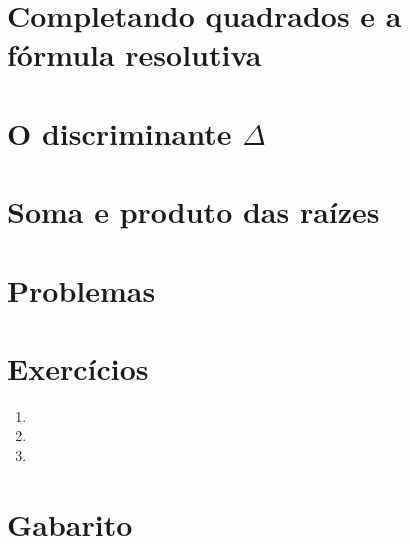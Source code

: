 \documentclass[11pt,a4paper]{article}
\begin{document}
\section{Completando quadrados e a fórmula resolutiva}

\section{O discriminante $\Delta$}

\section{Soma e produto das raízes}

\section{Problemas}


\section{Exercícios}
\begin{enumerate}[label=\textbf{\arabic*.}]
  \item %
  \item %
  \item %
\end{enumerate}

\begin{desafio}
\end{desafio}

\section*{Gabarito}
\end{document}
